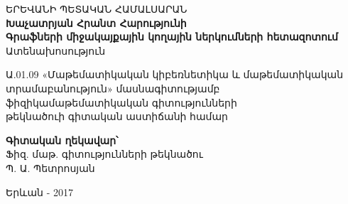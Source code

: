 \thispagestyle{empty}
\begin{center}

\textsc{\Large ԵՐԵՎԱՆԻ ՊԵՏԱԿԱՆ ՀԱՄԱԼՍԱՐԱՆ}\\[4cm]

{\Large \bfseries Խաչատրյան Հրանտ Հարությունի\\[1.5cm]}
{\Large \bfseries Գրաֆների միջակայքային կողային ներկումների հետազոտում\\[1.5cm]}
{\Large Ատենախոսություն \\[1.5cm]}

\large Ա.01.09 «Մաթեմատիկական կիբեռնետիկա և  
մաթեմատիկական \\ տրամաբանություն» մասնագիտությամբ  \\
ֆիզիկամաթեմատիկական գիտությունների \\
թեկնածուի գիտական աստիճանի համար \\[1.5cm]

\begin{flushright}
\large\textbf{Գիտական ղեկավար՝}\\
Ֆիզ. մաթ. գիտությունների թեկնածու\\
Պ. Ա. Պետրոսյան\\
\end{flushright}

\vfill

{\large Երևան - 2017}

\end{center}